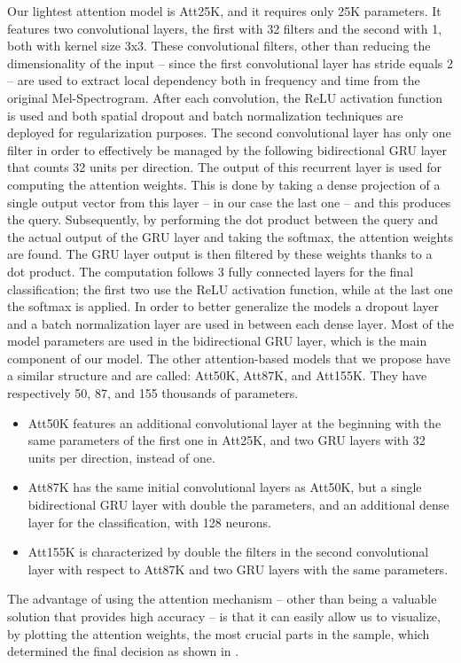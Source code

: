 Our lightest attention model is Att25K, and it requires only 25K parameters. It features two convolutional layers, the first with 32 filters and the second with 1, both with kernel size 3x3. 
These convolutional filters, other than reducing the dimensionality of the input -- since the first convolutional layer has stride equals  2 -- are used to extract local dependency both in frequency and time from the original Mel-Spectrogram.
After each convolution, the ReLU activation function is used and both spatial dropout and batch normalization techniques are deployed for regularization purposes. The second convolutional layer has only one filter in order to effectively be managed by the following bidirectional GRU layer that counts 32 units per direction. 
The output of this recurrent layer is used for computing the attention weights. This is done by taking a dense projection of a single output vector from this layer -- in our case the last one -- and this produces the query. Subsequently, by performing the dot product between the query and the actual output of the GRU layer and taking the softmax, the attention weights are found. The GRU layer output is then filtered by these weights thanks to a dot product. The computation follows 3 fully connected layers for the final classification; the first two use the ReLU activation function, while at the last one the softmax is applied. In order to better generalize the models a dropout layer and a batch normalization layer are used in between each dense layer.
Most of the model parameters are used in the bidirectional GRU layer, which is the main component of our model.
The other attention-based models that we propose have a similar structure and are called: Att50K, Att87K, and Att155K. They have respectively 50, 87, and 155 thousands of parameters.
\begin{itemize}
  \item Att50K features an additional convolutional layer at the beginning with the same parameters of the first one in Att25K, and two GRU layers with 32 units per direction, instead of one.
  \item Att87K has the same initial convolutional layers as Att50K, but a single bidirectional GRU layer with double the parameters, and an additional dense layer for the classification, with 128 neurons.
  \item Att155K is characterized by double the filters in the second convolutional layer with respect to Att87K and two GRU layers with the same parameters.

\end{itemize}
The advantage of using the attention mechanism -- other than being a valuable solution that provides high accuracy -- is that it can easily allow us to visualize, by plotting the attention weights, the most crucial parts in the sample, which determined the final decision as shown in \cite{1}.



